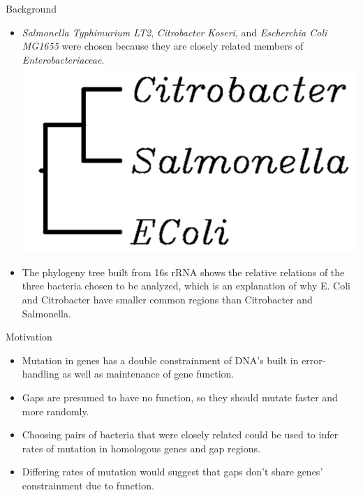 \documentclass[final]{beamer}
\begin{document}
\begin{frame}{}
\begin{columns}[t]
\begin{column}{.32 \linewidth}
\begin{block}{\large Background}
\begin{itemize}
					\item \textit{Salmonella Typhimurium LT2}, \textit{Citrobacter Koseri}, and \textit{Escherchia Coli MG1655} were chosen because they are closely related members of \textit{Enterobacteriaceae}.
					\newline
					\includegraphics[scale = 1]{phylogeny.png}
					\newline
					\item The phylogeny tree built from 16s rRNA shows the relative relations of the three bacteria chosen to be analyzed, which is an explanation of why E. Coli and Citrobacter have smaller common regions than Citrobacter and Salmonella.
				\end{itemize}
			\end{block}
			
			\begin{block}{\large Motivation}
				
				\begin{itemize}
					
					\item Mutation in genes has a double constrainment of DNA's built in error-handling as well as maintenance of gene function. 
					
					\item Gaps are presumed to have no function, so they should mutate faster and more randomly.  
					
					\item Choosing pairs of bacteria that were closely related could be used to infer rates of mutation in homologous genes and gap regions. 
					
					\item Differing rates of mutation would suggest that gaps don't share genes' constrainment due to function.
				\end{itemize}
			\end{block}
			

\end{column}
\end{columns}
\end{frame}
\end{document}
